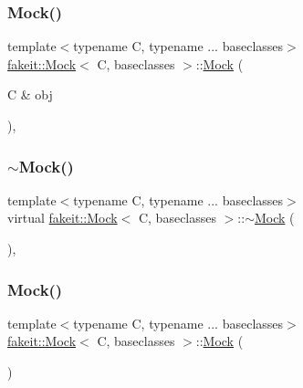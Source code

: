 \subsubsection{\texorpdfstring{Mock()}{Mock()}\hspace{0.1cm}{\footnotesize\ttfamily [16/18]}}
{\footnotesize\ttfamily template$<$typename C, typename ... baseclasses$>$ \\
\mbox{\hyperlink{classfakeit_1_1Mock}{fakeit\+::\+Mock}}$<$ C, baseclasses $>$\+::\mbox{\hyperlink{classfakeit_1_1Mock}{Mock}} (\begin{DoxyParamCaption}\item[{C \&}]{obj }\end{DoxyParamCaption})\hspace{0.3cm}{\ttfamily [inline]}, {\ttfamily [explicit]}}

\mbox{\label{classfakeit_1_1Mock_af5ecff29779ab75289c260d0a56705ab}} 
\subsubsection{\texorpdfstring{$\sim$Mock()}{~Mock()}\hspace{0.1cm}{\footnotesize\ttfamily [9/9]}}
{\footnotesize\ttfamily template$<$typename C, typename ... baseclasses$>$ \\
virtual \mbox{\hyperlink{classfakeit_1_1Mock}{fakeit\+::\+Mock}}$<$ C, baseclasses $>$\+::$\sim$\mbox{\hyperlink{classfakeit_1_1Mock}{Mock}} (\begin{DoxyParamCaption}{ }\end{DoxyParamCaption})\hspace{0.3cm}{\ttfamily [virtual]}, {\ttfamily [default]}}

\mbox{\label{classfakeit_1_1Mock_af7a86c609a2ee704ee09de6db066c7f4}} 
\subsubsection{\texorpdfstring{Mock()}{Mock()}\hspace{0.1cm}{\footnotesize\ttfamily [17/18]}}
{\footnotesize\ttfamily template$<$typename C, typename ... baseclasses$>$ \\
\mbox{\hyperlink{classfakeit_1_1Mock}{fakeit\+::\+Mock}}$<$ C, baseclasses $>$\+::\mbox{\hyperlink{classfakeit_1_1Mock}{Mock}} (\begin{DoxyParamCaption}{ }\end{DoxyParamCaption})\hspace{0.3cm}{\ttfamily [inline]}}

